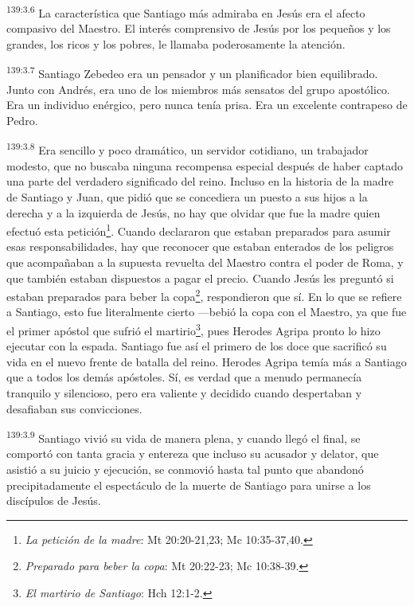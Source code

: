 \par
\textsuperscript{139:3.6} La característica que Santiago más admiraba en Jesús era el afecto compasivo del Maestro. El interés comprensivo de Jesús por los pequeños y los grandes, los ricos y los pobres, le llamaba poderosamente la atención.

\par
\textsuperscript{139:3.7} Santiago Zebedeo era un pensador y un planificador bien equilibrado. Junto con Andrés, era uno de los miembros más sensatos del grupo apostólico. Era un individuo enérgico, pero nunca tenía prisa. Era un excelente contrapeso de Pedro.

\par
\textsuperscript{139:3.8} Era sencillo y poco dramático, un servidor cotidiano, un trabajador modesto, que no buscaba ninguna recompensa especial después de haber captado una parte del verdadero significado del reino. Incluso en la historia de la madre de Santiago y Juan, que pidió que se concediera un puesto a sus hijos a la derecha y a la izquierda de Jesús, no hay que olvidar que fue la madre quien efectuó esta petición\footnote{\textit{La petición de la madre}: Mt 20:20-21,23; Mc 10:35-37,40.}. Cuando declararon que estaban preparados para asumir esas responsabilidades, hay que reconocer que estaban enterados de los peligros que acompañaban a la supuesta revuelta del Maestro contra el poder de Roma, y que también estaban dispuestos a pagar el precio. Cuando Jesús les preguntó si estaban preparados para beber la copa\footnote{\textit{Preparado para beber la copa}: Mt 20:22-23; Mc 10:38-39.}, respondieron que sí. En lo que se refiere a Santiago, esto fue literalmente cierto ---bebió la copa con el Maestro, ya que fue el primer apóstol que sufrió el martirio\footnote{\textit{El martirio de Santiago}: Hch 12:1-2.}, pues Herodes Agripa pronto lo hizo ejecutar con la espada. Santiago fue así el primero de los doce que sacrificó su vida en el nuevo frente de batalla del reino. Herodes Agripa temía más a Santiago que a todos los demás apóstoles. Sí, es verdad que a menudo permanecía tranquilo y silencioso, pero era valiente y decidido cuando despertaban y desafiaban sus convicciones.

\par
\textsuperscript{139:3.9} Santiago vivió su vida de manera plena, y cuando llegó el final, se comportó con tanta gracia y entereza que incluso su acusador y delator, que asistió a su juicio y ejecución, se conmovió hasta tal punto que abandonó precipitadamente el espectáculo de la muerte de Santiago para unirse a los discípulos de Jesús.

